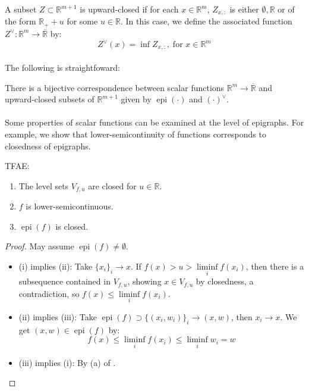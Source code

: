 \begin{defn}
	\label{defn:021-ucset-assfunc}
	A subset $Z\subset \mathbb{R}^{m+1}$ is upward-closed if for each $x\in \mathbb{R}^m$, $Z_{x,:}$ is either $\emptyset,\mathbb{R}$ or of the form $\mathbb{R}_++u$ for some $u\in \mathbb{R}$. In this case, we define the associated function $Z^\vee:\mathbb{R}^m\to \overline{\mathbb{R}}$ by:
	\[
		Z^\vee(x)=\inf Z_{x,:},\;\text{for }x\in \mathbb{R}^m
	\]
\end{defn}

\paragraph{}The following is straightfoward:

\begin{prop}
	\label{prop:021-epi-corr-set}
	There is a bijective correspondence between scalar functions $\mathbb{R}^m\to \overline{\mathbb{R}}$ and upward-closed subsets of $\mathbb{R}^{m+1}$ given by $\operatorname{epi}(\cdot)$ and $(\cdot)^\vee$.
\end{prop}

\paragraph{}Some properties of scalar functions can be examined at the level of epigraphs. For example, we show that lower-semicontinuity of functions corresponds to closedness of epigraphs.
\begin{prop}
	\label{prop:021-epi-lsc}
	TFAE:
	\begin{enumerate}[label=(\roman*)]
		\item The level sets $V_{f,u}$ are closed for $u\in \mathbb{R}$.
		\item $f$ is lower-semicontinuous.
		\item $\operatorname{epi}(f)$ is closed.
	\end{enumerate}
\end{prop}

\begin{proof}
	May assume $\operatorname{epi}(f)\neq\emptyset$.
	\begin{itemize}
		\item (i) implies (ii): Take $\{x_i\}_i\to x$. If $f(x)>u>\underset{i}{\operatorname{liminf}}f(x_i)$, then there is a subsequence contained in $V_{f,u}$, showing $x\in V_{f,u}$ by closedness, a contradiction, so $f(x)\leq \underset{i}{\operatorname{liminf}}f(x_i)$.
		\item (ii) implies (iii): Take $\operatorname{epi}(f)\supset\{(x_i,w_i)\}_i\to(x,w)$, then $x_i\to x$. We get $(x,w)\in \operatorname{epi}(f)$ by:
		      \[f(x)\leq\underset{i}{\operatorname{liminf}}f(x_i)\leq \underset{i}{\operatorname{liminf}}w_i=w\]
		\item  (iii) implies (i): By (a) of .\qedhere{}
	\end{itemize}
\end{proof}

